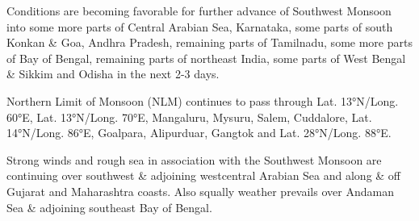 \item Conditions are becoming favorable for further advance of Southwest Monsoon into some more parts of Central Arabian Sea, Karnataka, some parts of south Konkan \& Goa, Andhra Pradesh, remaining parts of Tamilnadu, some more parts of Bay of
Bengal, remaining parts of northeast India, some parts of West Bengal \& Sikkim and Odisha in the next 2-3 days.
\item Northern Limit of Monsoon (NLM) continues to pass through Lat. 13°N/Long. 60°E, Lat. 13°N/Long. 70°E, Mangaluru,
Mysuru, Salem, Cuddalore, Lat. 14°N/Long. 86°E, Goalpara, Alipurduar, Gangtok and Lat. 28°N/Long. 88°E.
\item Strong winds and rough sea in association with the Southwest Monsoon are continuing over southwest \& adjoining
westcentral Arabian Sea and along \& off Gujarat and Maharashtra coasts. Also squally weather prevails over Andaman Sea \&
adjoining southeast Bay of Bengal.